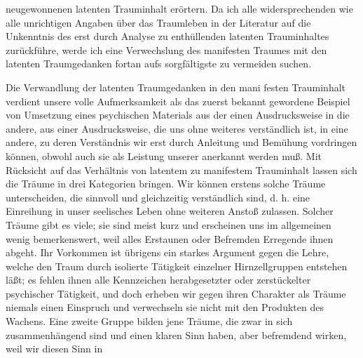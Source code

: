 \documentclass[twoside=true,titlepage=false,open=any, parskip=never, fontsize=10pt, headings=small, chapterprefix=false, appendixprefix=false]{scrbook}
\begin{document}
         
            
            
            
        \pstart
        neugewonnenen latenten Trauminhalt erörtern. Da ich alle
               widersprechenden wie alle unrichtigen Angaben über das Traumleben in
               der Literatur auf die Unkenntnis des erst durch Analyse zu enthüllenden latenten
               Trauminhaltes zurückführe, werde ich eine Verwechslung des manifesten Traumes mit den
               latenten Traumgedanken fortan aufs sorgfältigste zu
                  vermeiden suchen.
        \pend
    
         
            
            
            \pend
            
        \pstart
        Die Verwandlung der latenten Traumgedanken in den mani festen Trauminhalt
               verdient unsere volle Aufmerksamkeit als das zuerst bekannt gewordene Beispiel
               von Umsetzung eines psychischen Materials aus der einen
               Ausdrucksweise in die andere, aus einer Ausdrucksweise, die uns ohne weiteres
               verständlich ist, in eine andere, zu deren Verständnis wir erst durch Anleitung
               und Bemühung vordringen können, obwohl auch sie als Leistung unserer  anerkannt werden muß. Mit Rücksicht auf das Verhältnis von latentem zu
               manifestem Trauminhalt lassen sich die Träume in drei Kategorien bringen. Wir
               können erstens solche Träume unterscheiden, die sinnvoll und gleichzeitig verständlich sind, d. h. eine Einreihung in unser seelisches Leben ohne
               weiteren Anstoß zulassen. Solcher Träume gibt es viele; sie sind meist kurz und
               erscheinen uns im allgemeinen wenig bemerkenswert, weil alles
               Erstaunen oder Befremden Erregende ihnen abgeht. Ihr Vorkommen ist übrigens ein
               starkes Argument gegen die Lehre, welche den Traum durch isolierte
               Tätigkeit einzelner Hirnzellgruppen entstehen läßt; es fehlen ihnen alle
               Kennzeichen herabgesetzter oder zerstückelter psychischer Tätigkeit, und doch
               erheben wir gegen ihren Charakter als Träume niemals einen Einspruch und
               verwechseln sie nicht mit den Produkten des Wachens. Eine zweite Gruppe bilden
               jene Träume, die zwar in sich zusammenhängend sind und einen klaren Sinn
               haben, aber befremdend wirken, weil wir diesen Sinn
               in
        \pend
    
\end{document}

